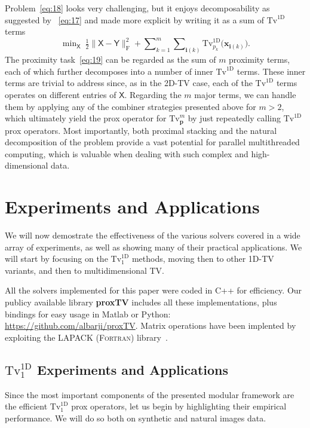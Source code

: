 \documentclass[twoside,11pt]{article}
\newcommand{\vi}{\bm{i}}       \newcommand{\vih}{\hat{\bm{i}}}        \newcommand{\ih}{\hat{i}}    \newcommand{\vit}{\tilde{\bm{i}}}       \newcommand{\itild}{\tilde{i}}
\newcommand{\vp}{\bm{p}}       \newcommand{\vph}{\hat{\bm{p}}}        \newcommand{\ph}{\hat{p}}    \newcommand{\vpt}{\tilde{\bm{p}}}       \newcommand{\pt}{\tilde{p}}
\newcommand{\vx}{\bm{x}}       \newcommand{\vxh}{\hat{\bm{x}}}        \newcommand{\xh}{\hat{x}}    \newcommand{\vxt}{\tilde{\bm{x}}}       \newcommand{\xt}{\tilde{x}}
\newcommand{\tx}{\mathsf{X}}
\newcommand{\ty}{\mathsf{Y}}
\newcommand{\frob}[1]{\|{#1}\|_{\text{F}}}
\newcommand{\nlsum}{\sum\nolimits}
\newcommand{\nlmin}{\min\nolimits}
\newcommand{\half}{\tfrac{1}{2}}
\newcommand{\tvell}{\text{Tv}}
\newcommand{\oned}{\text{1D}}
\numberwithin{equation}{section}
\numberwithin{theorem}{section}
\begin{document}
Problem~\eqref{eq:18} looks very challenging, but it enjoys decomposability as suggested by ~\eqref{eq:17} and made more explicit by writing it as a sum of $\tvell^{\oned}$ terms
\begin{equation}
  \label{eq:19}
  \nlmin_{\tx}\ \half\frob{\tx-\ty}^2 + \nlsum_{k=1}^m\nlsum_{\vi(k)} \tvell^{\oned}_{p_k}\bigl(\vx_{\vi(k)}\bigr).
\end{equation}
The proximity task~\eqref{eq:19} can be regarded as the sum of $m$ proximity terms, each of which further decomposes into a number of inner $\tvell^{\oned}$ terms. These inner terms are trivial to address since, as in the 2D-TV case, each of the $\tvell^{\oned}$ terms operates on different entries of $\tx$. Regarding the $m$ major terms, we can handle them by applying any of the combiner strategies presented above for $m>2$, which ultimately yield the prox operator for $\tvell^m_{\vp}$ by just repeatedly calling $\tvell^{\oned}$ prox operators. Most importantly, both proximal stacking and the natural decomposition of the problem provide a vast potential for parallel multithreaded computing, which is valuable when dealing with such complex and high-dimensional data.

\section{Experiments and Applications}
\label{sec:exps}
We will now demostrate the effectiveness of the various solvers covered in a wide array of experiments, as well as showing many of their practical applications. We will start by focusing on the $\tvell_1^{\oned}$ methods, moving then to other 1D-TV variants, and then to multidimensional TV.

All the solvers implemented for this paper were coded in C++ for efficiency. Our publicy available library {\bf proxTV} includes all these implementations, plus bindings for easy usage in Matlab or Python: \href{https://github.com/albarji/proxTV}{https://github.com/albarji/proxTV}. Matrix operations have been implented by exploiting the LAPACK (\textsc{Fortran}) library~\citep{LAPACK}.

\subsection{$\tvell_1^{\oned}$ Experiments and Applications}
\label{sec:TVproxExp}
Since the most important components of the presented modular framework are the efficient $\tvell_1^{\oned}$ prox operators, let us begin by highlighting their empirical performance. We will do so both on synthetic and natural images data.
\end{document}
